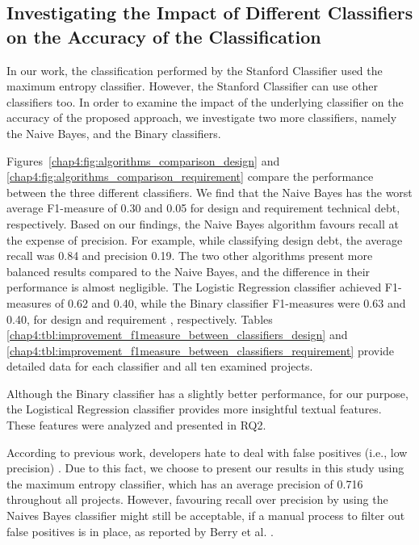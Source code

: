 \subsection{Investigating the Impact of Different Classifiers on the Accuracy of the Classification}
\label{chap4:sec:underlying_classifier}
In our work, the classification performed by the Stanford Classifier used the maximum entropy classifier. However, the Stanford Classifier can use other classifiers too. In order to examine the impact of the underlying classifier on the accuracy of the proposed approach, we investigate two more classifiers, namely the Naive Bayes, and the Binary classifiers.
 
Figures~\ref{chap4:fig:algorithms_comparison_design} and \ref{chap4:fig:algorithms_comparison_requirement} compare the performance between the three different classifiers. We find that the Naive Bayes has the worst average F1-measure of 0.30 and 0.05 for design and requirement technical debt, respectively. Based on our findings, the Naive Bayes algorithm favours recall at the expense of precision. For example, while classifying design debt, the average recall was 0.84 and precision 0.19. The two other algorithms present more balanced results compared to the Naive Bayes, and the difference in their performance is almost negligible. The Logistic Regression classifier achieved F1-measures of 0.62 and 0.40, while the Binary classifier F1-measures were 0.63 and 0.40, for design and requirement \SATD, respectively. Tables \ref{chap4:tbl:improvement_f1measure_between_classifiers_design} and \ref{chap4:tbl:improvement_f1measure_between_classifiers_requirement} provide detailed data for each classifier and all ten examined projects.

Although the Binary classifier has a slightly better performance, for our purpose, the Logistical Regression classifier provides more insightful textual features. These features were analyzed and presented in RQ2. 

According to previous work, developers hate to deal with false positives (i.e., low precision) \cite{Bessey2010FBL,Ernst2015FSE,Sadowski2015ICSE}. Due to this fact, we choose to present our results in this study using the maximum entropy classifier, which has an average precision of 0.716 throughout all projects. However, favouring recall over precision by using the Naives Bayes classifier might still be acceptable, if a manual process to filter out false positives is in place, as reported by Berry et al. \cite{Berry2012book}.

